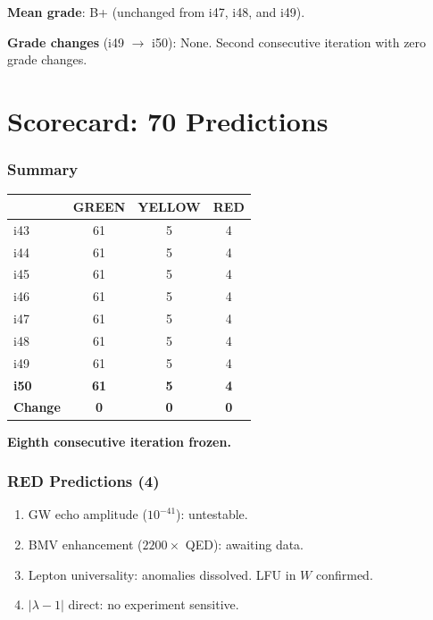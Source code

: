 \documentclass[11pt,a4paper]{article}
\newcommand{\GREEN}{\textcolor{dfdgreen}{\textbf{GREEN}}}
\newcommand{\YELLOW}{\textcolor{dfdyellow}{\textbf{YELLOW}}}
\newcommand{\RED}{\textcolor{dfdred}{\textbf{RED}}}
\begin{document}
\textbf{Mean grade}: B+ (unchanged from i47, i48, and i49).

\textbf{Grade changes} (i49 $\to$ i50): None. Second consecutive iteration with zero grade changes.


\part{Scorecard: 70 Predictions}

\section{Summary}

\begin{center}
\begin{tabular}{lccc}
\toprule
& \textbf{\GREEN} & \textbf{\YELLOW} & \textbf{\RED} \\
\midrule
i43 & 61 & 5 & 4 \\
i44 & 61 & 5 & 4 \\
i45 & 61 & 5 & 4 \\
i46 & 61 & 5 & 4 \\
i47 & 61 & 5 & 4 \\
i48 & 61 & 5 & 4 \\
i49 & 61 & 5 & 4 \\
\textbf{i50} & \textbf{61} & \textbf{5} & \textbf{4} \\
\textbf{Change} & \textbf{0} & \textbf{0} & \textbf{0} \\
\bottomrule
\end{tabular}
\end{center}

\textbf{Eighth consecutive iteration frozen.}

\section{RED Predictions (4)}

\begin{enumerate}
\item GW echo amplitude ($10^{-41}$): untestable.
\item BMV enhancement ($2200\times$ QED): awaiting data.
\item Lepton universality: anomalies dissolved. LFU in $W$ confirmed.
\item $|\lambda-1|$ direct: no experiment sensitive.
\end{enumerate}
\end{document}
